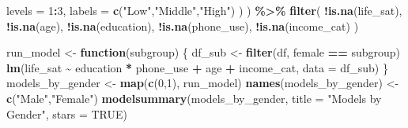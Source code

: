 \documentclass[
  11pt,
]{article}
\newenvironment{Shaded}{\begin{snugshade}}{\end{snugshade}}
\newcommand{\AttributeTok}[1]{\textcolor[rgb]{0.13,0.29,0.53}{#1}}
\newcommand{\ConstantTok}[1]{\textcolor[rgb]{0.56,0.35,0.01}{#1}}
\newcommand{\ControlFlowTok}[1]{\textcolor[rgb]{0.13,0.29,0.53}{\textbf{#1}}}
\newcommand{\DecValTok}[1]{\textcolor[rgb]{0.00,0.00,0.81}{#1}}
\newcommand{\FunctionTok}[1]{\textcolor[rgb]{0.13,0.29,0.53}{\textbf{#1}}}
\newcommand{\NormalTok}[1]{#1}
\newcommand{\OtherTok}[1]{\textcolor[rgb]{0.56,0.35,0.01}{#1}}
\newcommand{\SpecialCharTok}[1]{\textcolor[rgb]{0.81,0.36,0.00}{\textbf{#1}}}
\newcommand{\StringTok}[1]{\textcolor[rgb]{0.31,0.60,0.02}{#1}}
\begin{document}
\begin{Shaded}
\begin{Highlighting}[]
                   \AttributeTok{levels =} \DecValTok{1}\SpecialCharTok{:}\DecValTok{3}\NormalTok{,}
                   \AttributeTok{labels =} \FunctionTok{c}\NormalTok{(}\StringTok{"Low"}\NormalTok{,}\StringTok{"Middle"}\NormalTok{,}\StringTok{"High"}\NormalTok{)}
\NormalTok{                 )}
\NormalTok{  ) }\SpecialCharTok{\%\textgreater{}\%}
  \FunctionTok{filter}\NormalTok{(}
    \SpecialCharTok{!}\FunctionTok{is.na}\NormalTok{(life\_sat),}
    \SpecialCharTok{!}\FunctionTok{is.na}\NormalTok{(age),}
    \SpecialCharTok{!}\FunctionTok{is.na}\NormalTok{(education),}
    \SpecialCharTok{!}\FunctionTok{is.na}\NormalTok{(phone\_use),}
    \SpecialCharTok{!}\FunctionTok{is.na}\NormalTok{(income\_cat)}
\NormalTok{  )}

\NormalTok{run\_model }\OtherTok{\textless{}{-}} \ControlFlowTok{function}\NormalTok{(subgroup) \{}
\NormalTok{  df\_sub }\OtherTok{\textless{}{-}} \FunctionTok{filter}\NormalTok{(df, female }\SpecialCharTok{==}\NormalTok{ subgroup)}
  \FunctionTok{lm}\NormalTok{(life\_sat }\SpecialCharTok{\textasciitilde{}}\NormalTok{ education }\SpecialCharTok{*}\NormalTok{ phone\_use }\SpecialCharTok{+}\NormalTok{ age }\SpecialCharTok{+}\NormalTok{ income\_cat, }\AttributeTok{data =}\NormalTok{ df\_sub)}
\NormalTok{\}}
\NormalTok{models\_by\_gender }\OtherTok{\textless{}{-}} \FunctionTok{map}\NormalTok{(}\FunctionTok{c}\NormalTok{(}\DecValTok{0}\NormalTok{,}\DecValTok{1}\NormalTok{), run\_model)}
\FunctionTok{names}\NormalTok{(models\_by\_gender) }\OtherTok{\textless{}{-}} \FunctionTok{c}\NormalTok{(}\StringTok{"Male"}\NormalTok{,}\StringTok{"Female"}\NormalTok{)}
\FunctionTok{modelsummary}\NormalTok{(models\_by\_gender, }\AttributeTok{title =} \StringTok{"Models by Gender"}\NormalTok{, }\AttributeTok{stars =} \ConstantTok{TRUE}\NormalTok{)}
\end{Highlighting}
\end{Shaded}
\end{document}
